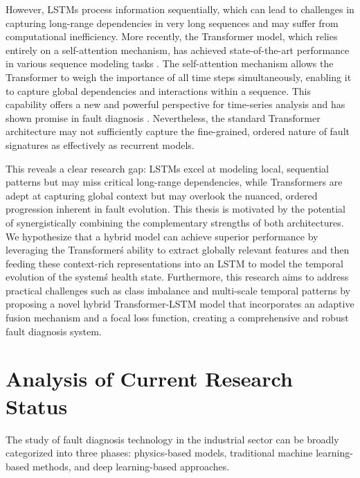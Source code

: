 However, LSTMs process information sequentially, which can lead to challenges in capturing long-range dependencies in very long sequences and may suffer from computational inefficiency. More recently, the Transformer model, which relies entirely on a self-attention mechanism, has achieved state-of-the-art performance in various sequence modeling tasks \cite{vaswani2017attention}. The self-attention mechanism allows the Transformer to weigh the importance of all time steps simultaneously, enabling it to capture global dependencies and interactions within a sequence. This capability offers a new and powerful perspective for time-series analysis and has shown promise in fault diagnosis \cite{wen2021time}. Nevertheless, the standard Transformer architecture may not sufficiently capture the fine-grained, ordered nature of fault signatures as effectively as recurrent models.

This reveals a clear research gap: LSTMs excel at modeling local, sequential patterns but may miss critical long-range dependencies, while Transformers are adept at capturing global context but may overlook the nuanced, ordered progression inherent in fault evolution. This thesis is motivated by the potential of synergistically combining the complementary strengths of both architectures. We hypothesize that a hybrid model can achieve superior performance by leveraging the Transformer\'s ability to extract globally relevant features and then feeding these context-rich representations into an LSTM to model the temporal evolution of the system\'s health state. Furthermore, this research aims to address practical challenges such as class imbalance and multi-scale temporal patterns by proposing a novel hybrid Transformer-LSTM model that incorporates an adaptive fusion mechanism and a focal loss function, creating a comprehensive and robust fault diagnosis system.

\section{Analysis of Current Research Status}
\label{sec:introduction:current_status}

The study of fault diagnosis technology in the industrial sector can be broadly categorized into three phases: physics-based models, traditional machine learning-based methods, and deep learning-based approaches.

